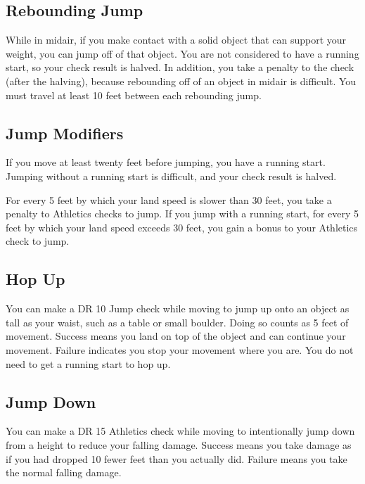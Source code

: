     \subsection{Rebounding Jump}\label{Rebounding Jump}
        While in midair, if you make contact with a solid object that can support your weight, you can jump off of that object. You are not considered to have a running start, so your check result is halved. In addition, you take a  penalty to the check (after the halving), because rebounding off of an object in midair is difficult. You must travel at least 10 feet between each rebounding jump.

    \subsection{Jump Modifiers}\label{Jump Modifiers}

        \label{Running Start} If you move at least twenty feet before jumping, you have a running start. Jumping without a running start is difficult, and your check result is halved.

         For every 5 feet by which your land speed is slower than 30 feet, you take a  penalty to Athletics checks to jump. If you jump with a running start, for every 5 feet by which your land speed exceeds 30 feet, you gain a  bonus to your Athletics check to jump.

    \subsection{Hop Up}
        You can make a DR 10 Jump check while moving to jump up onto an object as tall as your waist, such as a table or small boulder. Doing so counts as 5 feet of movement. Success means you land on top of the object and can continue your movement. Failure indicates you stop your movement where you are. You do not need to get a running start to hop up.

    \subsection{Jump Down}
        You can make a DR 15 Athletics check while moving to intentionally jump down from a height to reduce your falling damage. Success means you take damage as if you had dropped 10 fewer feet than you actually did. Failure means you take the normal falling damage.

